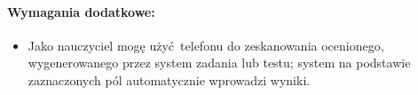 \documentclass[polish,12pt]{aghthesis}
\begin{document}
\paragraph{Wymagania dodatkowe:}
\begin{itemize}
	\item Jako nauczyciel mogę użyć telefonu do zeskanowania ocenionego, wygenerowanego przez system zadania lub testu; system na podstawie zaznaczonych pól automatycznie wprowadzi wyniki.
\end{itemize}


\section{\SectionTitleRealizationAspects}
\label{sec:wybrane-aspekty-realizacji}

\section{\SectionTitleWorkOrganization}
\label{sec:organizacja-pracy}

\section{\SectionTitleResults}
\label{sec:wyniki-projektu}




\end{document}
